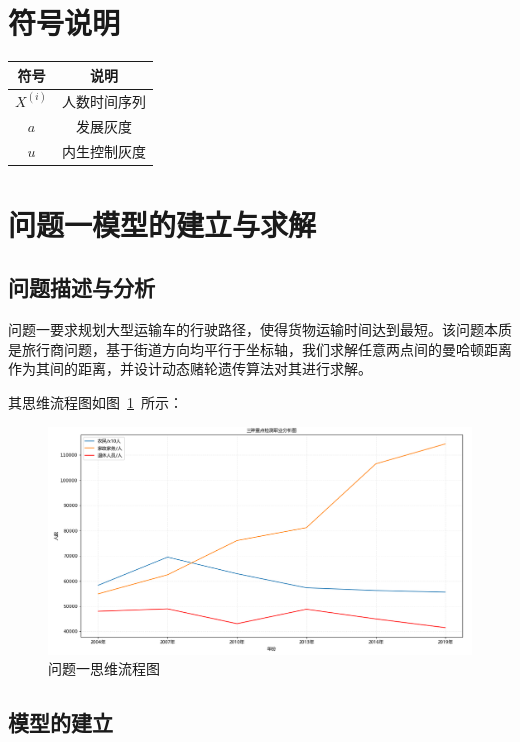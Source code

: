 \documentclass{whutmod}
\begin{document}
	\section{符号说明}
	\begin{table}[H]
	\label{biao} \centering
	\begin{tabular}{cc}
		\toprule[1.5pt]
		\multicolumn{1}{m{5cm}}{\centering 符号} & \multicolumn{1}{m{5cm}}{\centering 说明} \\
		\midrule[0.5pt]		
		$X^{(i)}$  & 人数时间序列  \\ 
		$a$  &  发展灰度 \\ 
		$u$  &  内生控制灰度\\
		\bottomrule[1.5pt]
	\end{tabular}
\end{table}

	\section{问题一模型的建立与求解}
    \subsection{问题描述与分析}
问题一要求规划大型运输车的行驶路径，使得货物运输时间达到最短。该问题本质是旅行商问题，基于街道方向均平行于坐标轴，我们求解任意两点间的曼哈顿距离作为其间的距离，并设计动态赌轮遗传算法对其进行求解。


    其思维流程图如图~\ref{lct}~所示：

       \begin{figure}[H]
	   	\centering
	   	\includegraphics[width=\textwidth]{figures/sanrenf.png}
	   	\caption{问题一思维流程图}\label{lct}
	   \end{figure}

   
	    \subsection{模型的建立}
\end{document}
